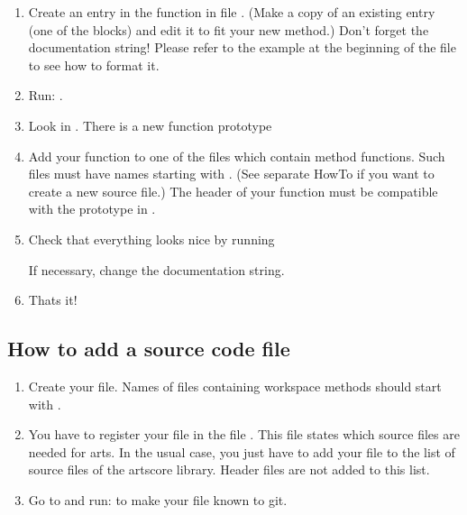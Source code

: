 \begin{enumerate}
\item Create an entry in the function  in file
  .  (Make a copy of an existing entry (one of the
   blocks) and edit it to fit your new
  method.) Don't forget the documentation string! Please refer to the
  example at the beginning of the file to see how to format it.
\item Run:
  .
\item Look in . There is a new function prototype
  \begin{quote}
  \end{quote}
\item Add your function to one of the  files which contain method
  functions. Such files must have names starting with . (See
  separate HowTo if you want to create a new source file.) The header
  of your function must be compatible with the prototype in .
\item Check that everything looks nice by running 
  \begin{quote}
  \end{quote}
  If necessary, change the documentation string.

\item Thats it!
\end{enumerate}


\subsection{How to add a source code file}
\begin{enumerate}
\item Create your file. Names of files containing workspace methods should
  start with .
\item You have to register your file in the file
  . This file states which source files
  are needed for arts. In the usual case, you just have to add your
   file to the list of source files of the artscore
  library. Header files are not added to this list.
\item Go to  and run:  to
  make your file known to git.
\end{enumerate}


